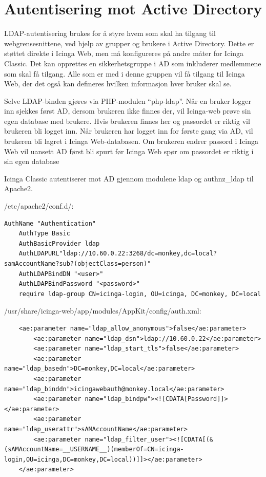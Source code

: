 \section{Autentisering mot Active Directory}\label{sec:ldapauth}
LDAP-autentisering brukes for å styre hvem som skal ha tilgang til webgrensesnittene, ved hjelp av grupper og brukere i Active Directory. Dette er støttet direkte i Icinga Web, men må konfigureres på andre måter for Icinga Classic. Det kan opprettes en sikkerhetsgruppe i AD som inkluderer medlemmene som skal få tilgang. Alle som er med i denne gruppen vil få tilgang til Icinga Web, der det også kan defineres hvilken informasjon hver bruker skal se. 

Selve LDAP-binden gjøres via PHP-modulen ``php-ldap''. Når en bruker logger inn sjekkes først AD, dersom brukeren ikke finnes der, vil Icinga-web prøve sin egen database med brukere. Hvis brukeren finnes her og passordet er riktig vil brukeren bli logget inn. Når brukeren har logget inn for første gang via AD, vil brukeren bli lagret i Icinga Web-databasen. Om brukeren endrer passord i Icinga Web vil uansett AD først bli spurt før Icinga Web spør om passordet er riktig i sin egen database

Icinga Classic autentiserer mot AD gjennom modulene ldap og authnz\_ldap til Apache2.

/etc/apache2/conf.d/:
\begin{lstlisting}[style=example]
    AuthName "Authentication"
    AuthType Basic
    AuthBasicProvider ldap
    AuthLDAPURL"ldap://10.60.0.22:3268/dc=monkey,dc=local?samAccountName?sub?(objectClass=person)"
    AuthLDAPBindDN "<user>"
    AuthLDAPBindPassword "<password>"
    require ldap-group CN=icinga-login, OU=icinga, DC=monkey, DC=local
\end{lstlisting}

/usr/share/icinga-web/app/modules/AppKit/config/auth.xml:
\begin{lstlisting}
    <ae:parameter name="ldap_allow_anonymous">false</ae:parameter>
        <ae:parameter name="ldap_dsn">ldap://10.60.0.22</ae:parameter>
        <ae:parameter name="ldap_start_tls">false</ae:parameter>
        <ae:parameter name="ldap_basedn">DC=monkey,DC=local</ae:parameter>
        <ae:parameter name="ldap_binddn">icingawebauth@monkey.local</ae:parameter>
        <ae:parameter name="ldap_bindpw"><![CDATA[Password]]></ae:parameter>
        <ae:parameter name="ldap_userattr">sAMAccountName</ae:parameter>
        <ae:parameter name="ldap_filter_user"><![CDATA[(&(sAMAccountName=__USERNAME__)(memberOf=CN=icinga-login,OU=icinga,DC=monkey,DC=local))]]></ae:parameter>
    </ae:parameter>
\end{lstlisting}

